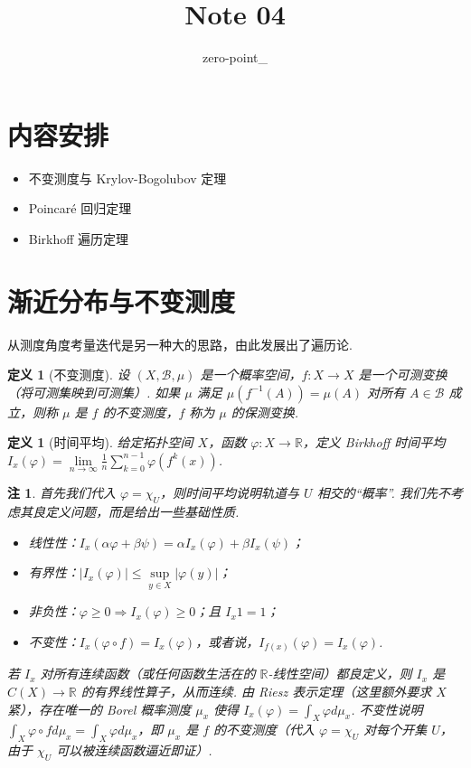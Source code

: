\documentclass[11pt, a4paper, oneside]{ctexart}
\title{Note 04}
\author{zero-point\_}
\newtheorem{definition}[theorem]{定义}
\newtheorem{remark}[theorem]{注}
\newcommand{\R}{\mathbb{R}}
\newcommand{\cB}{\mathcal{B}}
\newcommand{\abs}[1]{\left|{#1}\right|}
\begin{document}
	\maketitle
    \section{内容安排}
    \begin{itemize}
        \item 不变测度与 Krylov-Bogolubov 定理
        \item Poincaré 回归定理
        \item Birkhoff 遍历定理
    \end{itemize}

    \section{渐近分布与不变测度}
    从测度角度考量迭代是另一种大的思路，由此发展出了遍历论.

    \begin{definition}[不变测度]
        设 $(X, \cB, \mu)$ 是一个概率空间，$f: X \to X$ 是一个可测变换（将可测集映到可测集）. 如果 $\mu$ 满足 $\mu(f^{-1}(A)) = \mu(A)$ 对所有 $A \in \cB$ 成立，则称 $\mu$ 是 $f$ 的不变测度，$f$ 称为 $\mu$ 的保测变换.
    \end{definition}
    \begin{definition}[时间平均]
        给定拓扑空间 $X$，函数 $\varphi:X\to \R$，定义 Birkhoff 时间平均 $I_x(\varphi)=\lim\limits_{n\to\infty}\frac{1}{n}\sum\limits_{k=0}^{n-1}\varphi(f^k(x))$.
    \end{definition}
    \begin{remark}\label{注2.3}
        首先我们代入 $\varphi=\chi_U$，则时间平均说明轨道与 $U$ 相交的“概率”. 我们先不考虑其良定义问题，而是给出一些基础性质.
        \begin{itemize}
            \item 线性性：$I_x(\alpha\varphi+\beta\psi)=\alpha I_x(\varphi)+\beta I_x(\psi)$；
            \item 有界性：$\abs{I_x(\varphi)}\leq \sup\limits_{y\in X}\abs{\varphi(y)}$；
            \item 非负性：$\varphi\geq 0\Rightarrow I_x(\varphi)\geq 0$；且 $I_x 1=1$；
            \item 不变性：$I_x(\varphi\circ f)=I_x(\varphi)$，或者说，$I_{f(x)}(\varphi)=I_x(\varphi)$.
        \end{itemize}
        若 $I_x$ 对所有连续函数（或任何函数生活在的 $\R$-线性空间）都良定义，则 $I_x$ 是 $C(X)\to \R$ 的有界线性算子，从而连续. 由 Riesz 表示定理（这里额外要求 $X$ 紧），存在唯一的 Borel 概率测度 $\mu_x$ 使得 $I_x(\varphi)=\int_X \varphi d\mu_x$. 不变性说明 $\int_X \varphi\circ f d\mu_x=\int_X \varphi d\mu_x$，即 $\mu_x$ 是 $f$ 的不变测度（代入 $\varphi=\chi_U$ 对每个开集 $U$，由于 $\chi_U$ 可以被连续函数逼近即证）.
    \end{remark}
\end{document}
